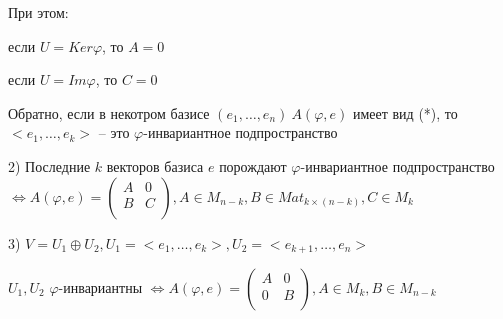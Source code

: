 При этом:

если $U = Ker \varphi$, то $A = 0$

если $U = Im \varphi$, то $C = 0$

Обратно, если в некотром базисе $(e_1, \dots, e_n) \ A(\varphi, e)$ имеет вид (*), то $<e_1, \dots, e_k>$ -- это $\varphi$-инвариантное подпространство

\vspace{\baselineskip}
2) Последние $k$ векторов базиса $e$ порождают $\varphi$-инвариантное подпространство $\Leftrightarrow A(\varphi, e) = \left(
\begin{array}{c|c}
  A & 0  \\
  \hline
  B & C  \\
\end{array}
\right), A \in M_{n-k}, B \in Mat_{k \times (n - k)}, C \in M_k$

\vspace{\baselineskip}
3) $V = U_1 \oplus U_2, U_1 = <e_1, \dots, e_k>, U_2 = <e_{k+1}, \dots, e_n>$

$U_1, U_2$ $\varphi$-инвариантны $\Leftrightarrow A(\varphi, e) = \left(
\begin{array}{c|c}
  A & 0  \\
  \hline
  0 & B  \\
\end{array}
\right), A \in M_k, B \in M_{n-k}$

